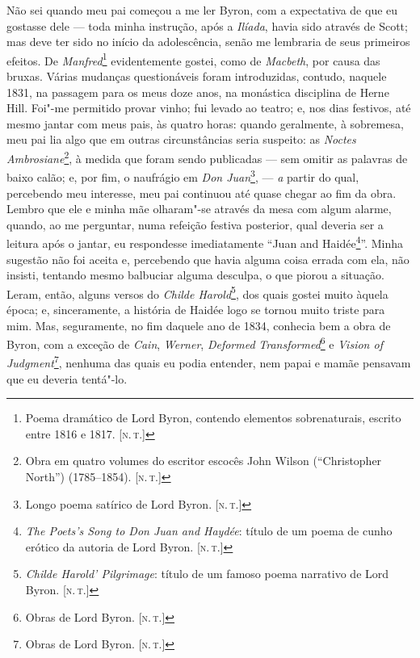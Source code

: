 Não sei quando meu pai começou a me ler Byron, com a expectativa de que
eu gostasse dele --- toda minha instrução, após a \emph{Ilíada}, havia
sido através de Scott; mas deve ter sido no início da adolescência,
senão me lembraria de seus primeiros efeitos. De
\emph{Manfred}\footnote{Poema dramático de Lord Byron, contendo
  elementos sobrenaturais, escrito entre 1816 e 1817. {[}\textsc{n.\,t.}{]}}
evidentemente gostei, como de \emph{Macbeth}, por causa das bruxas.
Várias mudanças questionáveis foram introduzidas, contudo, naquele 1831,
na passagem para os meus doze anos, na monástica disciplina de Herne
Hill. Foi"-me permitido provar vinho; fui levado ao teatro; e, nos dias
festivos, até mesmo jantar com meus pais, às quatro horas: quando
geralmente, à sobremesa, meu pai lia algo que em outras circunstâncias
seria suspeito: as \emph{Noctes} \emph{Ambrosiane}\footnote{Obra em
  quatro volumes do escritor escocês John Wilson (``Christopher North'')
  (1785--1854). {[}\textsc{n.\,t.}{]}}, à medida que foram sendo publicadas ---
sem omitir as palavras de baixo calão; e, por fim, o naufrágio em
\emph{Don Juan}\footnote{Longo poema satírico de Lord Byron. {[}\textsc{n.\,t.}{]}}, --- \emph{a} partir do qual, percebendo meu interesse,
meu pai continuou até quase chegar ao fim da obra. Lembro que ele e
minha mãe olharam"-se através da mesa com algum alarme, quando, ao me
perguntar, numa refeição festiva posterior, qual deveria ser a leitura
após o jantar, eu respondesse imediatamente ``Juan and Haidée\footnote{\emph{The
  Poets's Song to Don Juan and Haydée}: título de um poema de cunho
  erótico da autoria de Lord Byron. {[}\textsc{n.\,t.}{]}}''. Minha sugestão
não foi aceita e, percebendo que havia alguma coisa errada com ela, não
insisti, tentando mesmo balbuciar alguma desculpa, o que piorou a
situação. Leram, então, alguns versos do \emph{Childe Harold}\footnote{\emph{Childe
  Harold' Pilgrimage}: título de um famoso poema narrativo de Lord Byron.
  {[}\textsc{n.\,t.}{]}}, dos quais gostei muito àquela época; e,
sinceramente, a história de Haidée logo se tornou muito triste para mim.
Mas, seguramente, no fim daquele ano de 1834, conhecia bem a obra de
Byron, com a exceção de \emph{Cain}, \emph{Werner}, \emph{Deformed}
\emph{Transformed}\footnote{Obras de Lord Byron. {[}\textsc{n.\,t.}{]}} e
\emph{Vision of Judgment}\footnote{Obras de Lord Byron. {[}\textsc{n.\,t.}{]}},
nenhuma das quais eu podia entender, nem papai e mamãe pensavam que eu
deveria tentá"-lo.

